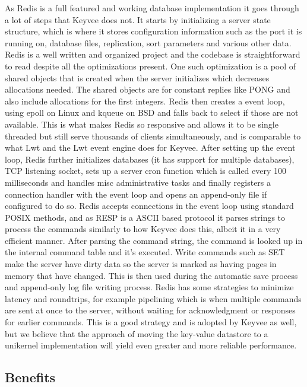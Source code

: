 \documentclass[english,10pt,twocolumn]{article}
\begin{document}
As Redis is a full featured and working database implementation it goes through a lot of steps that Keyvee does not.
It starts by initializing a server state structure, which is where it stores configuration information such as the port it is running on, database files, replication, sort parameters and various other data.
Redis is a well written and organized project and the codebase is straightforward to read despite all the optimizations present.
One such optimization is a pool of shared objects that is created when the server initializes which decreases allocations needed.
The shared objects are for constant replies like PONG and also include allocations for the first integers. \cite{redisunderthehood}
Redis then creates a event loop, using epoll on Linux and kqueue on BSD and falls back to select if those are not available.
This is what makes Redis so responsive and allows it to be single threaded but still serve thousands of clients simultaneously, and is comparable to what Lwt and the Lwt event engine does for Keyvee.
After setting up the event loop, Redis further initializes databases (it has support for multiple databases), TCP listening socket, sets up a server cron function which is called every 100 milliseconds and handles misc administrative tasks and finally registers a connection handler with the event loop and opens an append-only file if configured to do so.
Redis accepts connections in the event loop using standard POSIX methods, and as RESP is a ASCII based protocol it parses strings to process the commands similarly to how Keyvee does this, albeit it in a very efficient manner.
After parsing the command string, the command is looked up in the internal command table and it's executed.
Write commands such as SET make the server have dirty data so the server is marked as having pages in memory that have changed.
This is then used during the automatic save process and append-only log file writing process.
Redis has some strategies to minimize latency and roundtrips, for example pipelining which is when multiple commands are sent at once to the server, without waiting for acknowledgment or responses for earlier commands.
This is a good strategy and is adopted by Keyvee as well, but we believe that the approach of moving the key-value datastore to a unikernel implementation will yield even greater and more reliable performance.


\subsection{Benefits}
\end{document}
